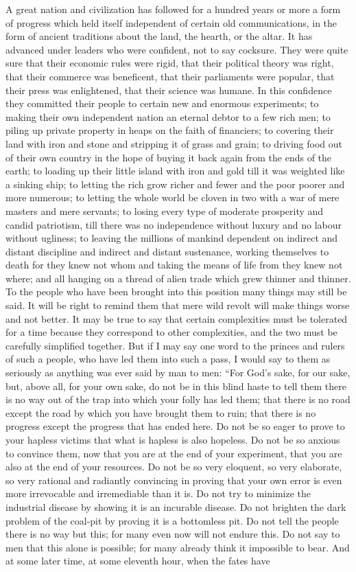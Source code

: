 \documentclass{book}
\begin{document}
A great nation and civilization has followed for a hundred years or more a form of progress which held itself independent of certain old communications, in the form of ancient traditions about the land, the hearth, or the altar. It has advanced under leaders who were confident, not to say cocksure. They were quite sure that their economic rules were rigid, that their political theory was right, that their commerce was beneficent, that their parliaments were popular, that their press was enlightened, that their science was humane. In this confidence they committed their people to certain new and enormous experiments; to making their own independent nation an eternal debtor to a few rich men; to piling up private property in heaps on the faith of financiers; to covering their land with iron and stone and stripping it of grass and grain; to driving food out of their own country in the hope of buying it back again from the ends of the earth; to loading up their little island with iron and gold till it was weighted like a sinking ship; to letting the rich grow richer and fewer and the poor poorer and more numerous; to letting the whole world be cloven in two with a war of mere masters and mere servants; to losing every type of moderate prosperity and candid patriotism, till there was no independence without luxury and no labour without ugliness; to leaving the millions of mankind dependent on indirect and distant discipline and indirect and distant sustenance, working themselves to death for they knew not whom and taking the means of life from they knew not where; and all hanging on a thread of alien trade which grew thinner and thinner. To the people who have been brought into this position many things may still be said. It will be right to remind them that mere wild revolt will make things worse and not better. It may be true to say that certain complexities must be tolerated for a time because they correspond to other complexities, and the two must be carefully simplified together. But if I may say one word to the princes and rulers of such a people, who have led them into such a pass, I would say to them as seriously as anything was ever said by man to men: “For God’s sake, for our sake, but, above all, for your own sake, do not be in this blind haste to tell them there is no way out of the trap into which your folly has led them; that there is no road except the road by which you have brought them to ruin; that there is no progress except the progress that has ended here. Do not be so eager to prove to your hapless victims that what is hapless is also hopeless. Do not be so anxious to convince them, now that you are at the end of your experiment, that you are also at the end of your resources. Do not be so very eloquent, so very elaborate, so very rational and radiantly convincing in proving that your own error is even more irrevocable and irremediable than it is. Do not try to minimize the industrial disease by showing it is an incurable disease. Do not brighten the dark problem of the coal-pit by proving it is a bottomless pit. Do not tell the people there is no way but this; for many even now will not endure this. Do not say to men that this alone is possible; for many already think it impossible to bear. And at some later time, at some eleventh hour, when the fates have 
\end{document}
